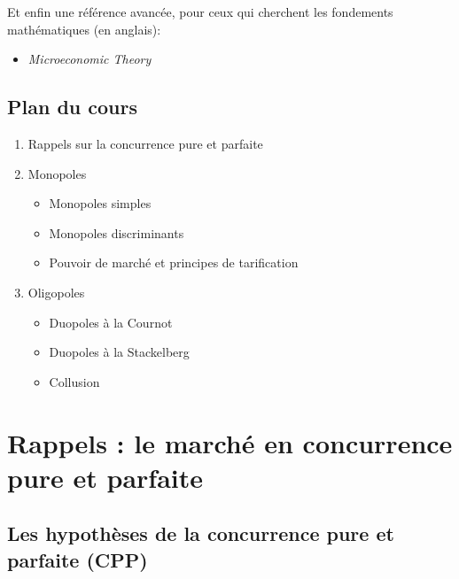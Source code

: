\documentclass[
]{book}
\providecommand{\tightlist}{%
  \setlength{\itemsep}{0pt}\setlength{\parskip}{0pt}}
\theoremstyle{definition}
\theoremstyle{definition}
\theoremstyle{definition}
\theoremstyle{definition}
\theoremstyle{remark}
\begin{document}
Et enfin une référence avancée, pour ceux qui cherchent les fondements mathématiques (en anglais):

\begin{itemize}
\tightlist
\item
  \citet{mas1995} \emph{Microeconomic Theory}
\end{itemize}

\hypertarget{plan-du-cours}{%
\section{Plan du cours}\label{plan-du-cours}}

\begin{enumerate}
\def\labelenumi{\arabic{enumi}.}
\tightlist
\item
  Rappels sur la concurrence pure et parfaite
\item
  Monopoles

  \begin{itemize}
  \tightlist
  \item
    Monopoles simples
  \item
    Monopoles discriminants
  \item
    Pouvoir de marché et principes de tarification
  \end{itemize}
\item
  Oligopoles

  \begin{itemize}
  \tightlist
  \item
    Duopoles à la Cournot
  \item
    Duopoles à la Stackelberg
  \item
    Collusion
  \end{itemize}
\end{enumerate}

\hypertarget{rappels-le-marchuxe9-en-concurrence-pure-et-parfaite}{%
\chapter{Rappels : le marché en concurrence pure et parfaite}\label{rappels-le-marchuxe9-en-concurrence-pure-et-parfaite}}

\hypertarget{les-hypothuxe8ses-de-la-concurrence-pure-et-parfaite-cpp}{%
\section{Les hypothèses de la concurrence pure et parfaite (CPP)}\label{les-hypothuxe8ses-de-la-concurrence-pure-et-parfaite-cpp}}
\end{document}
